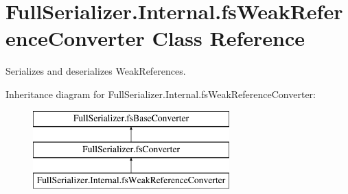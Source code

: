 \hypertarget{class_full_serializer_1_1_internal_1_1fs_weak_reference_converter}{}\section{Full\+Serializer.\+Internal.\+fs\+Weak\+Reference\+Converter Class Reference}
\label{class_full_serializer_1_1_internal_1_1fs_weak_reference_converter}


Serializes and deserializes Weak\+References.  


Inheritance diagram for Full\+Serializer.\+Internal.\+fs\+Weak\+Reference\+Converter\+:\begin{figure}[H]
\begin{center}
\leavevmode
\includegraphics[height=3.000000cm]{class_full_serializer_1_1_internal_1_1fs_weak_reference_converter}
\end{center}
\end{figure}
